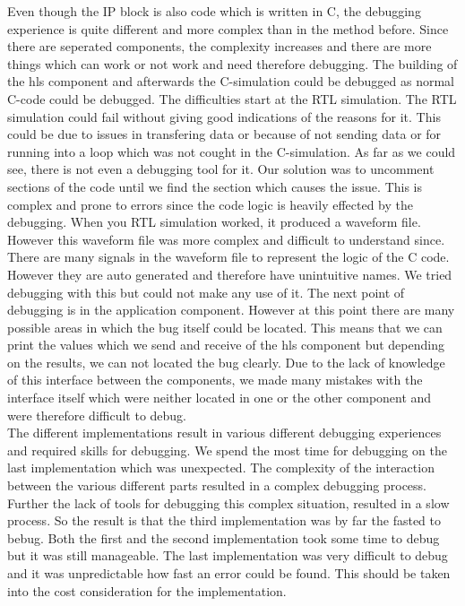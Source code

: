 \documentclass[conference]{IEEEtran}
\begin{document}
Even though the IP block is also code which is written in C, the debugging experience is quite different and more complex than in the method before. Since there are seperated components, the complexity increases and there are more things which can work or not work and need therefore debugging. The building of the hls component and afterwards the C-simulation could be debugged as normal C-code could be debugged. The difficulties start at the RTL simulation. The RTL simulation could fail without giving good indications of the reasons for it. This could be due to issues in transfering data or because of not sending data or for running into a loop which was not cought in the C-simulation. As far as we could see, there is not even a debugging tool for it. Our solution was to uncomment sections of the code until we find the section which causes the issue. This is complex and prone to errors since the code logic is heavily effected by the debugging. When you RTL simulation worked, it produced a waveform file. However this waveform file was more complex and difficult to understand since. There are many signals in the waveform file to represent the logic of the C code. However they are auto generated and therefore have unintuitive names. We tried debugging with this but could not make any use of it. The next point of debugging is in the application component. However at this point there are many possible areas in which the bug itself could be located. This means that we can print the values which we send and receive of the hls component but depending on the results, we can not located the bug clearly. Due to the lack of knowledge of this interface between the components, we made many mistakes with the interface itself which were neither located in one or the other component and were therefore difficult to debug. \\
The different implementations result in various different debugging experiences and required skills for debugging. We spend the most time for debugging on the last implementation which was unexpected. The complexity of the interaction between the various different parts resulted in a complex debugging process. Further the lack of tools for debugging this complex situation, resulted in a slow process. So the result is that the third implementation was by far the fasted to bebug. Both the first and the second implementation took some time to debug but it was still manageable. The last implementation was very difficult to debug and it was unpredictable how fast an error could be found. This should be taken into the cost consideration for the implementation.
\end{document}
